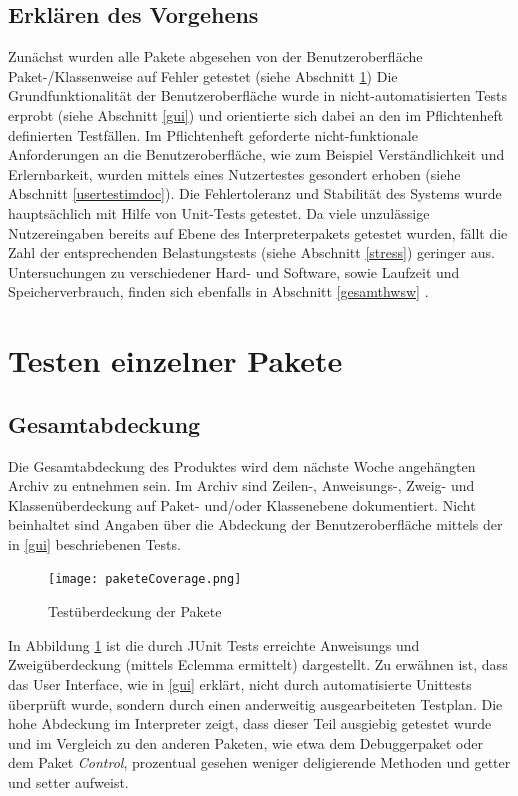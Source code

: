\documentclass[parskip=full]{scrartcl}
\begin{document}
\subsection{Erklären des Vorgehens}
Zunächst wurden alle Pakete abgesehen von der Benutzeroberfläche Paket-/Klassenweise auf Fehler getestet (siehe Abschnitt \ref{einzelnePakete})
Die Grundfunktionalität der Benutzeroberfläche wurde in nicht-automatisierten Tests erprobt (siehe Abschnitt \ref{gui}) und orientierte sich dabei an den im Pflichtenheft definierten Testfällen. Im Pflichtenheft geforderte nicht-funktionale Anforderungen an die Benutzeroberfläche, wie zum Beispiel Verständlichkeit und Erlernbarkeit, wurden mittels eines Nutzertestes gesondert erhoben (siehe Abschnitt \ref{usertestimdoc}).
Die Fehlertoleranz und Stabilität des Systems wurde hauptsächlich mit Hilfe von Unit-Tests getestet. Da viele unzulässige Nutzereingaben bereits auf Ebene des Interpreterpakets getestet wurden, fällt die Zahl der entsprechenden Belastungstests (siehe Abschnitt \ref{stress}) geringer aus. Untersuchungen zu verschiedener Hard- und Software, sowie Laufzeit und Speicherverbrauch, finden sich ebenfalls in Abschnitt \ref{gesamthwsw} .

\newpage
\section{Testen einzelner Pakete}\label{einzelnePakete}

\subsection{Gesamtabdeckung}\label{abdeckung}
Die Gesamtabdeckung des Produktes wird dem nächste Woche angehängten Archiv zu entnehmen sein.
Im Archiv sind Zeilen-, Anweisungs-, Zweig- und Klassenüberdeckung auf Paket- und/oder Klassenebene dokumentiert.
Nicht beinhaltet sind Angaben über die Abdeckung der Benutzeroberfläche mittels der in \ref{gui} beschriebenen Tests.
\begin{figure}[!h]
\centering
\texttt{[image: paketeCoverage.png]}
\caption{Testüberdeckung der Pakete}\label{AbdeckungPakete}
\end{figure}

In Abbildung \ref{AbdeckungPakete} ist die durch JUnit Tests erreichte Anweisungs und Zweigüberdeckung (mittels Eclemma ermittelt) dargestellt. Zu erwähnen ist, dass das User Interface, wie in \ref{gui} erklärt, nicht durch automatisierte Unittests überprüft wurde, sondern durch einen anderweitig ausgearbeiteten Testplan. Die hohe Abdeckung im Interpreter zeigt, dass dieser Teil ausgiebig getestet wurde und im Vergleich zu den anderen Paketen, wie etwa dem Debuggerpaket oder dem Paket \textit{Control}, prozentual gesehen weniger deligierende Methoden und getter und setter aufweist.
\end{document}
